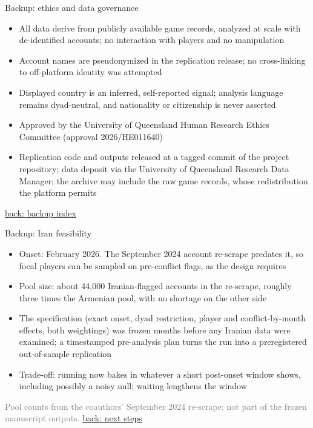 \documentclass[aspectratio=169,11pt,t]{beamer}
\newcommand{\backto}[2]{\vfill\hfill\hyperlink{#1}{\textcolor{linkblue}{\scriptsize\textsf{back: #2}}}}
\newcommand{\src}[1]{{\vfill\scriptsize\textcolor{gray}{#1}}}
\begin{document}
\begin{frame}[label=bk-ethics]{Backup: ethics and data governance}
  \begin{itemize}
    \item All data derive from publicly available game records, analyzed at scale with de-identified accounts; no interaction with players and no manipulation
    \item Account names are pseudonymized in the replication release; no cross-linking to off-platform identity was attempted
    \item Displayed country is an inferred, self-reported signal; analysis language remains dyad-neutral, and nationality or citizenship is never asserted
    \item Approved by the University of Queensland Human Research Ethics Committee (approval 2026/HE011640)
    \item Replication code and outputs released at a tagged commit of the project repository; data deposit via the University of Queensland Research Data Manager; the archive may include the raw game records, whose redistribution the platform permits
  \end{itemize}
  \backto{backup-index}{backup index}
\end{frame}

\begin{frame}[label=bk-iran]{Backup: Iran feasibility}
  \begin{itemize}
    \item Onset: February 2026. The September 2024 account re-scrape predates it, so focal players can be sampled on pre-conflict flags, as the design requires
    \item Pool size: about 44,000 Iranian-flagged accounts in the re-scrape, roughly three times the Armenian pool, with no shortage on the other side
    \item The specification (exact onset, dyad restriction, player and conflict-by-month effects, both weightings) was frozen months before any Iranian data were examined; a timestamped pre-analysis plan turns the run into a preregistered out-of-sample replication
    \item Trade-off: running now bakes in whatever a short post-onset window shows, including possibly a noisy null; waiting lengthens the window
  \end{itemize}
  \src{Pool counts from the coauthors' September 2024 re-scrape; not part of the frozen manuscript outputs.}
  \backto{nextsteps}{next steps}
\end{frame}
\end{document}
